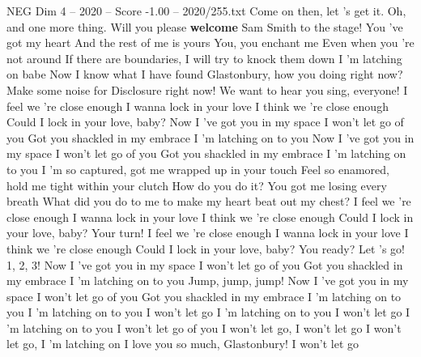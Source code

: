 \begin{textsample}{NEG Dim 4 – 2020 – Score -1.00 – 2020/255.txt}  \label{ex:f4_neg_029}
Come on then, let 's get it.
Oh, and one more thing.
Will you please \textbf{welcome} Sam Smith to the stage!
You 've got my heart And the rest of me is yours You, you enchant me Even when you 're not around If there are boundaries, I will try to knock them down I 'm latching on babe Now I know what I have found Glastonbury, how you doing right now?
Make some noise for Disclosure right now!
We want to hear you sing, everyone!
I feel we 're close enough I wanna lock in your love I think we 're close enough Could I lock in your love, baby?
Now I 've got you in my space I won't let go of you Got you shackled in my embrace I 'm latching on to you Now I 've got you in my space I won't let go of you Got you shackled in my embrace I 'm latching on to you I 'm so captured, got me wrapped up in your touch Feel so enamored, hold me tight within your clutch How do you do it?
You got me losing every breath What did you do to me to make my heart beat out my chest?
I feel we 're close enough I wanna lock in your love I think we 're close enough Could I lock in your love, baby?
Your turn!
I feel we 're close enough I wanna lock in your love I think we 're close enough Could I lock in your love, baby?
You ready?
Let 's go! 1, 2, 3!
Now I 've got you in my space I won't let go of you Got you shackled in my embrace I 'm latching on to you Jump, jump, jump!
Now I 've got you in my space I won't let go of you Got you shackled in my embrace I 'm latching on to you I 'm latching on to you I won't let go I 'm latching on to you I won't let go I 'm latching on to you I won't let go of you I won't let go, I won't let go I won't let go, I 'm latching on I love you so much, Glastonbury!
I won't let go

\end{textsample}
